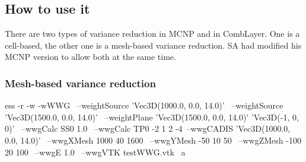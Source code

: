 \subsection{How to use it}
There are two types of variance reduction in MCNP and in CombLayer.
One is a cell-based, the other one is a mesh-based variance reduction.
SA had modified his MCNP version to allow both at the same time.

\subsubsection{Mesh-based variance reduction}
\label{sec:vr:cadis:mesh}
 \label{bash:vr:cadis:mesh:run}
\begin{bash}
ess -r -w -wWWG \ 
 --weightSource 'Vec3D(1000.0, 0.0, 14.0)' \
 --weightSource 'Vec3D(1500.0, 0.0, 14.0)' \
 --weightPlane 'Vec3D(1500.0, 0.0, 14.0)' 'Vec3D(-1, 0, 0)' \
 --wwgCalc SS0 1.0 \
 --wwgCalc TP0 -2 1 2 -4\
 --wwgCADIS 'Vec3D(1000.0, 0.0, 14.0)' \
 --wwgXMesh 1000 40 1600 \
 --wwgYMesh -50 10 50 \
 --wwgZMesh -100 20 100 \
 --wwgE 1.0 \
 --wwgVTK testWWG.vtk \
   a
\end{bash}

